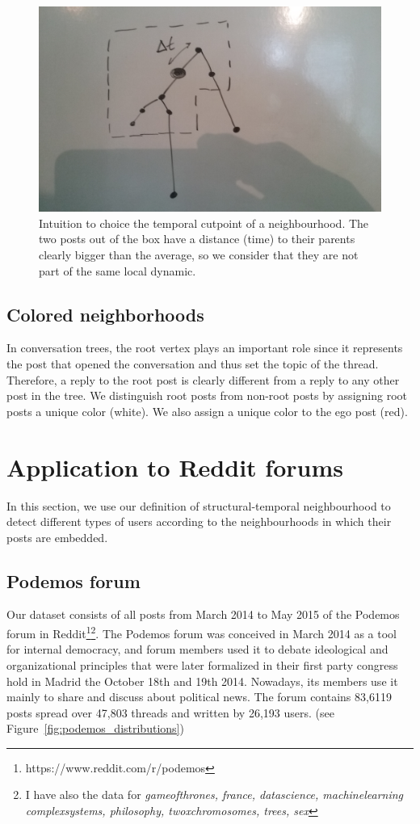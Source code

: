 \documentclass[smallextended]{svjour3}          %
\begin{document}
\begin{figure}
\centering
\includegraphics[width=1\textwidth]{temporal_cutpoint}
\caption{Intuition to choice the temporal cutpoint of a neighbourhood. The two posts out of the box have a distance (time) to their parents clearly bigger than the average, so we consider that they are not part of the same local dynamic.}
\label{fig:cutpoints}
\end{figure}

\subsection{Colored neighborhoods}
In conversation trees, the root vertex plays an important role since it represents the post that opened the conversation and thus set the topic of the thread. Therefore, a reply to the root post is clearly different from a reply to any other post in the tree. We distinguish root posts from non-root posts by assigning root posts a unique color (white). We also assign a unique color to the ego post (red). 


\section{Application to Reddit forums}
In this section, we use our definition of structural-temporal neighbourhood to detect different types of users according to the neighbourhoods in which their posts are embedded.

\subsection{Podemos forum}
Our dataset consists of all posts from March 2014 to May 2015 of the Podemos forum in Reddit\footnote{https://www.reddit.com/r/podemos}\footnote{I have also the data for \textit{gameofthrones, france, datascience, machinelearning complexsystems, philosophy, twoxchromosomes, trees, sex}}. The Podemos forum was conceived in March 2014 as a tool for internal democracy, and forum members used it to debate ideological and organizational principles that were later formalized in their first party congress hold in Madrid the October 18th and 19th 2014. Nowadays, its members use it mainly to share and discuss about political news.
The forum contains 83,6119 posts spread over 47,803 threads and written by 26,193 users. (see Figure~\ref{fig:podemos_distributions})
\end{document}
